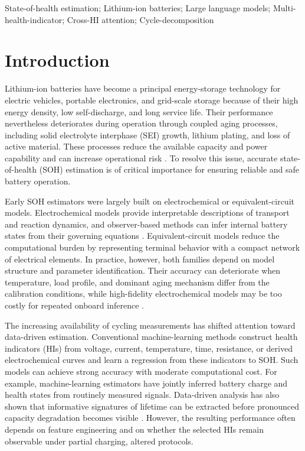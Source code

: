 \documentclass[preprint,12pt]{elsarticle}
\begin{document}
\begin{frontmatter}
\begin{abstract}
\end{abstract}

\begin{keyword}
State-of-health estimation; Lithium-ion batteries; Large language models; Multi-health-indicator; Cross-HI attention; Cycle-decomposition

\end{keyword}

\end{frontmatter}

\section{Introduction}
Lithium-ion batteries have become a principal energy-storage technology for electric vehicles, portable electronics, and grid-scale storage because of their high energy density, low self-discharge, and long service life. Their performance nevertheless deteriorates during operation through coupled aging processes, including solid electrolyte interphase (SEI) growth, lithium plating, and loss of active material. These processes reduce the available capacity and power capability and can increase operational risk \cite{edge2021degradation,birkl2017degradation}.  To resolve this issue, accurate state-of-health (SOH) estimation is of critical importance for ensuring reliable and safe battery operation.


Early SOH estimators were largely built on electrochemical or equivalent-circuit models. Electrochemical models provide interpretable descriptions of transport and reaction dynamics, and observer-based methods can infer internal battery states from their governing equations \cite{moura2017battery}. Equivalent-circuit models reduce the computational burden by representing terminal behavior with a compact network of electrical elements. In practice, however, both families depend on model structure and parameter identification. Their accuracy can deteriorate when temperature, load profile, and dominant aging mechanism differ from the calibration conditions, while high-fidelity electrochemical models may be too costly for repeated onboard inference \cite{berecibar2016critical}.

The increasing availability of cycling measurements has shifted attention toward data-driven estimation. Conventional machine-learning methods construct health indicators (HIs) from voltage, current, temperature, time, resistance, or derived electrochemical curves and learn a regression from these indicators to SOH. Such models can achieve strong accuracy with moderate computational cost. For example, machine-learning estimators \cite{ng2020predicting} have jointly inferred battery charge and health states from routinely measured signals. Data-driven analysis has also shown that informative signatures of lifetime can be extracted before pronounced capacity degradation becomes visible \cite{severson2019datadriven}. However, the resulting performance often depends on feature engineering and on whether the selected HIs remain observable under partial charging, altered protocols.
\end{document}
